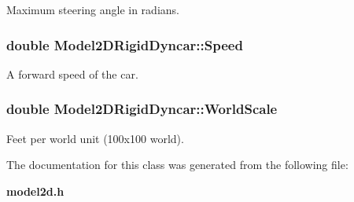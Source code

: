 Maximum steering angle in radians.

\subsubsection{\setlength{\rightskip}{0pt plus 5cm}double Model2DRigid\-Dyncar::Speed}\label{class_Model2DRigidDyncar_m8}


A forward speed of the car.

\subsubsection{\setlength{\rightskip}{0pt plus 5cm}double Model2DRigid\-Dyncar::World\-Scale}\label{class_Model2DRigidDyncar_m6}


Feet per world unit (100x100 world).



The documentation for this class was generated from the following file:\begin{CompactItemize}
\item 
{\bf model2d.h}\end{CompactItemize}
